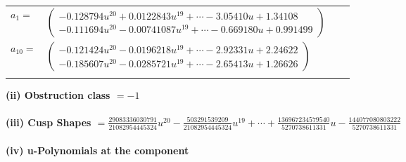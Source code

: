 \documentclass[1p]{elsarticle_modified}
\theoremstyle{definition}
\begin{document}
\begin{tabular}{m{7pt} m{180pt} m{7pt} m{180pt} }
\flushright $a_{1}=$&$\begin{pmatrix}-0.128794 u^{20}+0.0122843 u^{19}+\cdots-3.05410 u+1.34108\\-0.111694 u^{20}-0.00741087 u^{19}+\cdots-0.669180 u+0.991499\end{pmatrix}$ \\
\flushright $a_{10}=$&$\begin{pmatrix}-0.121424 u^{20}-0.0196218 u^{19}+\cdots-2.92331 u+2.24622\\-0.185607 u^{20}-0.0285721 u^{19}+\cdots-2.65413 u+1.26626\end{pmatrix}$\\&\end{tabular}
\flushleft \textbf{(ii) Obstruction class $= -1$}\\~\\
\flushleft \textbf{(iii) Cusp Shapes $= \frac{29083336030791}{21082954445324} u^{20}-\frac{503291539209}{21082954445324} u^{19}+\cdots+\frac{136967234579540}{5270738611331} u-\frac{144077080803222}{5270738611331}$}\\~\\
\newpage\renewcommand{\arraystretch}{1}
\flushleft \textbf{(iv) u-Polynomials at the component}\newline \\
\end{document}
